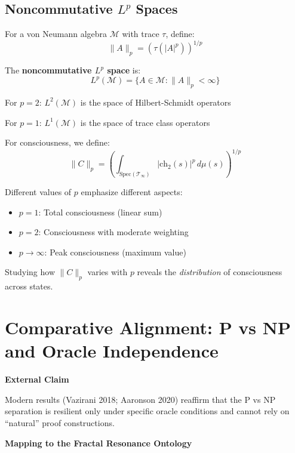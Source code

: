 \begin{advanced}
\subsection{Noncommutative $L^p$ Spaces}

For a von Neumann algebra $\mathcal{M}$ with trace $\tau$, define:
\begin{equation}
\| A \|_p = \left( \tau(|A|^p) \right)^{1/p}
\end{equation}

The \textbf{noncommutative $L^p$ space} is:
\begin{equation}
L^p(\mathcal{M}) = \{ A \in \mathcal{M} : \| A \|_p < \infty \}
\end{equation}

For $p=2$: $L^2(\mathcal{M})$ is the space of Hilbert-Schmidt operators

For $p=1$: $L^1(\mathcal{M})$ is the space of trace class operators

For consciousness, we define:
\begin{equation}
\| C \|_p = \left( \int_{\text{Spec}(\mathcal{T}_\infty)} |\text{ch}_2(s)|^p \, d\mu(s) \right)^{1/p}
\end{equation}

Different values of $p$ emphasize different aspects:
\begin{itemize}
\item $p=1$: Total consciousness (linear sum)
\item $p=2$: Consciousness with moderate weighting
\item $p \to \infty$: Peak consciousness (maximum value)
\end{itemize}

Studying how $\| C \|_p$ varies with $p$ reveals the \textit{distribution} of consciousness across states.
\end{advanced}

\section{Comparative Alignment: P vs NP and Oracle Independence}

\textbf{External Claim}

Modern results (Vazirani 2018; Aaronson 2020) reaffirm that the P vs NP separation is resilient only under specific oracle conditions and cannot rely on ``natural'' proof constructions.

\textbf{Mapping to the Fractal Resonance Ontology}

